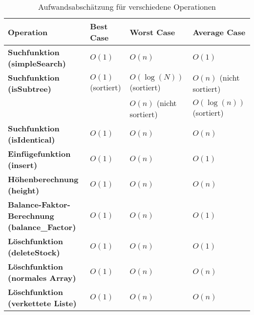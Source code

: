 \documentclass{article}
\begin{document}
\begin{table}[h]
    \centering
    \begin{tabular}{|l|l|l|l|}
    \hline
    \textbf{Operation}      & \textbf{Best Case} & \textbf{Worst Case} & \textbf{Average Case} \\ \hline
    \textbf{Suchfunktion (simpleSearch)} & $O(1)$              & $O(n)$              & $O(1)$                \\ \hline
    \textbf{Suchfunktion (isSubtree)} & $O(1)$ (sortiert)    & $O(\log(N))$ (sortiert)   & $O(n)$ (nicht sortiert) \\
                                       &  & $O(n)$ (nicht sortiert) & $O(\log(n))$ (sortiert)   \\ \hline
    \textbf{Suchfunktion (isIdentical)} & $O(1)$              & $O(n)$              & $O(n)$                \\ \hline
    \textbf{Einfügefunktion (insert)} & $O(1)$              & $O(n)$              & $O(1)$                \\ \hline
    \textbf{Höhenberechnung (height)} & $O(1)$              & $O(n)$              & $O(n)$                \\ \hline
    \textbf{Balance-Faktor-Berechnung (balance_Factor)} & $O(1)$              & $O(n)$              & $O(1)$                \\ \hline
    \textbf{Löschfunktion (deleteStock)} & $O(1)$              & $O(n)$              & $O(1)$                \\ \hline
    \textbf{Löschfunktion (normales Array)} & $O(1)$              & $O(n)$              & $O(n)$                \\ \hline
    \textbf{Löschfunktion (verkettete Liste)} & $O(1)$              & $O(n)$              & $O(n)$                \\ \hline
    \end{tabular}
    \caption{Aufwandsabschätzung für verschiedene Operationen}
    \label{tab:aufwandsabschaetzung}
    \end{table}
\end{document}
